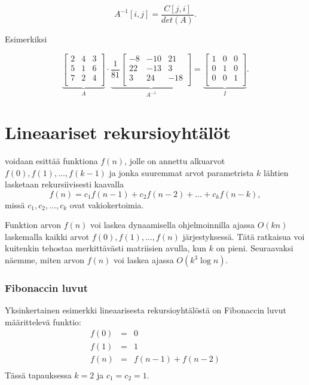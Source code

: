 \[A^{-1}[i,j] = \frac{C[j,i]}{det(A)}.\]

Esimerkiksi

\[
\underbrace{
 \begin{bmatrix}
  2 & 4 & 3\\
  5 & 1 & 6\\
  7 & 2 & 4\\
 \end{bmatrix}
}_{A}
\cdot
\underbrace{
 \frac{1}{81}
 \begin{bmatrix}
   -8 & -10 & 21 \\
   22 & -13 & 3 \\
   3 & 24 & -18 \\
 \end{bmatrix}
}_{A^{-1}}
=
\underbrace{
 \begin{bmatrix}
  1 & 0 & 0 \\
  0 & 1 & 0 \\
  0 & 0 & 1 \\
 \end{bmatrix}
}_{I}.
\]

\section{Lineaariset rekursioyhtälöt}


voidaan esittää funktiona $f(n)$,
jolle on annettu alkuarvot
$f(0),f(1),\ldots,f(k-1)$
ja jonka suuremmat arvot
parametrista $k$ lähtien lasketaan
rekursiivisesti kaavalla
\[f(n) = c_1 f(n-1) + c_2 f(n-2) + \ldots + c_k f (n-k),\]
missä $c_1,c_2,\ldots,c_k$ ovat vakiokertoimia.

Funktion arvon $f(n)$ voi laskea dynaamisella
ohjelmoinnilla ajassa $O(kn)$
laskemalla kaikki arvot $f(0),f(1),\ldots,f(n)$ järjestyksessä.
Tätä ratkaisua voi kuitenkin tehostaa merkittävästi
matriisien avulla, kun $k$ on pieni.
Seuraavaksi näemme, miten arvon $f(n)$
voi laskea ajassa $O(k^3 \log n)$.

\subsubsection{Fibonaccin luvut}


Yksinkertainen esimerkki lineaarisesta rekursioyhtälöstä
on Fibonaccin luvut määrittelevä funktio:
\[
\begin{array}{lcl}
f(0) & = & 0 \\
f(1) & = & 1 \\
f(n) & = & f(n-1)+f(n-2) \\
\end{array}
\]
Tässä tapauksessa $k=2$ ja $c_1=c_2=1$.


